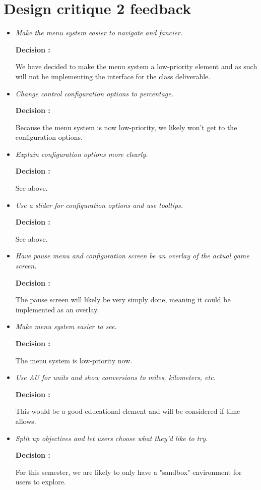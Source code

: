 \section{Design critique 2 feedback}

\begin{itemize}

  \item \emph{Make the menu system easier to navigate and fancier.}
        
        \textbf{Decision : } \parbox[t]{5in}{We have decided to make the menu system a low-priority element and as such will not be implementing the interface for the class deliverable.}
	
	\item \emph{Change control configuration options to percentage.}
	
				\textbf{Decision : } \parbox[t]{5in}{Because the menu system is now low-priority, we likely won't get to the configuration options.}
				
	\item \emph{Explain configuration options more clearly.}
	
				\textbf{Decision : } \parbox[t]{5in}{See above.}
				
	\item \emph{Use a slider for configuration options and use tooltips.}
	
				\textbf{Decision : } \parbox[t]{5in}{See above.}
				
	\item \emph{Have pause menu and configuration screen be an overlay of the actual game screen.}
	
				\textbf{Decision : } \parbox[t]{5in}{The pause screen will likely be very simply done, meaning it could be implemented as an overlay.}
	
	\item \emph{Make menu system easier to see.}
	
				\textbf{Decision : } \parbox[t]{5in}{The menu system is low-priority now.}
				
	\item \emph{Use AU for units and show conversions to miles, kilometers, etc.}
	
				\textbf{Decision : } \parbox[t]{5in}{This would be a good educational element and will be considered if time allows.}
				
	\item \emph{Split up objectives and let users choose what they'd like to try.}
	
				\textbf{Decision : } \parbox[t]{5in}{For this semester, we are likely to only have a "sandbox" environment for users to explore.}

\end{itemize}

